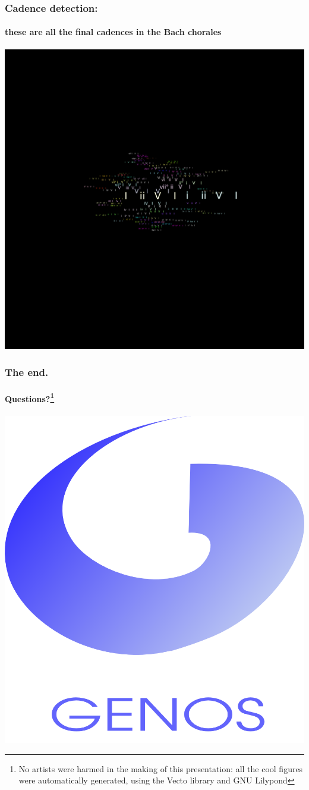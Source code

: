 \documentclass{beamer}
\begin{document}
\begin{frame}
  \frametitle{Cadence detection:}
  \framesubtitle{these are all the final cadences in the Bach chorales}
  \centering
  \includegraphics[scale=0.3, trim = 50em 0em 0em 50em, clip]{figs/cadences}
\end{frame}



\begin{frame}
  \frametitle{The end.}
  \framesubtitle{Questions?\footnote{No artists were harmed in the making of this presentation:
    all the cool figures were automatically generated, using the
    Vecto library and GNU Lilypond}}
  \centering
  \includegraphics[scale=0.3, trim = -25em 0em 0em 0em]{figs/genos}
\end{frame}
\end{document}
